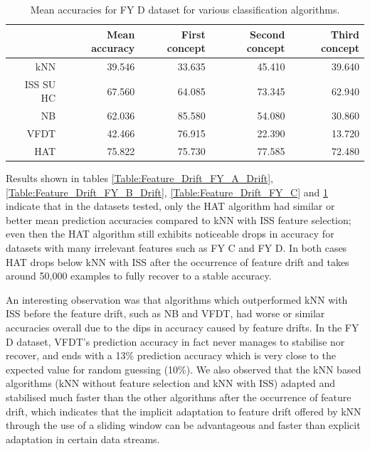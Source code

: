 \begin{table}[h]
\centering
\begin{tabular}{r|rrrr}
          & Mean accuracy & First concept & Second concept & Third concept \\ \hline
kNN       & 39.546        & 33.635                      & 45.410                        & 39.640                       \\
ISS SU HC & 67.560         & 64.085                      & 73.345                       & 62.940                       \\
NB        & 62.036        & 85.580                       & 54.080                        & 30.860                       \\
VFDT      & 42.466        & 76.915                      & 22.390                        & 13.720                       \\
HAT       & 75.822        & 75.730                       & 77.585                       & 72.480                      
\end{tabular}
\caption{Mean accuracies for FY D dataset for various classification algorithms.}
\label{Table:Feature_Drift_FY_D}
\end{table}

Results shown in tables \ref{Table:Feature_Drift_FY_A_Drift}, \ref{Table:Feature_Drift_FY_B_Drift}, \ref{Table:Feature_Drift_FY_C} and \ref{Table:Feature_Drift_FY_D} indicate that in the datasets tested, only the HAT algorithm had similar or better mean prediction accuracies compared to kNN with ISS feature selection; even then the HAT algorithm still exhibits noticeable drops in accuracy for datasets with many irrelevant features such as FY C and FY D. In both cases HAT drops below kNN with ISS after the occurrence of feature drift and takes around 50,000 examples to fully recover to a stable accuracy. 

An interesting observation was that algorithms which outperformed kNN with ISS before the feature drift, such as NB and VFDT, had worse or similar accuracies overall due to the dips in accuracy caused by feature drifts. In the FY D dataset, VFDT's prediction accuracy in fact never manages to stabilise nor recover, and ends with a 13\% prediction accuracy which is very close to the expected value for random guessing (10\%). We also observed that the kNN based algorithms (kNN without feature selection and kNN with ISS) adapted and stabilised much faster than the other algorithms after the occurrence of feature drift, which indicates that the implicit adaptation to feature drift offered by kNN through the use of a sliding window can be advantageous and faster than explicit adaptation in certain data streams.

